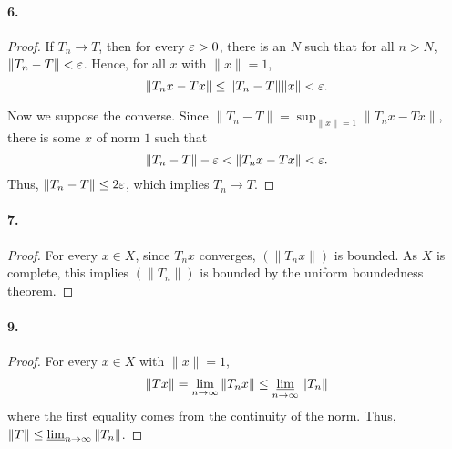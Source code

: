   \paragraph{6.}
  \begin{proof}
    If $T_n\to T$, then for every $\varepsilon>0$, there is an $N$ such that for all 
    $n>N$, $\|T_n-T\|<\varepsilon$. Hence, for all $x$ with $\|x\|=1$,
    \[
      \|T_nx-Tx\|\le \|T_n-T\|\|x\|<\varepsilon.
    \]\par
    Now we suppose the converse. Since $\|T_n-T\|=\sup_{\|x\|=1}\|T_nx-Tx\|$, 
    there is some $x$ of norm $1$ such that 
    \[
      \|T_n-T\|-\varepsilon<\|T_nx-Tx\|<\varepsilon.
    \]
    Thus, $\|T_n-T\|\le 2\varepsilon$, which implies $T_n\to T$.
  \end{proof}
  
  \paragraph{7.}
  \begin{proof}
    For every $x\in X$, since $T_nx$ converges, $(\|T_nx\|)$ is bounded. As $X$
    is complete, this implies $(\|T_n\|)$ is bounded by the uniform boundedness
    theorem.
  \end{proof}
  
  \paragraph{9.}
  \begin{proof}
    For every $x\in X$ with $\|x\|=1$, 
    \[
      \|Tx\|=\lim_{n\to\infty}\|T_nx\|\le \operatorname*{\underline{lim}}_{n\to\infty}\|T_n\|
    \]
    where the first equality comes from the continuity of the norm. Thus, $\|T\|
    \le \operatorname*{\underline{lim}}_{n\to\infty}\|T_n\|$.
  \end{proof}
  
